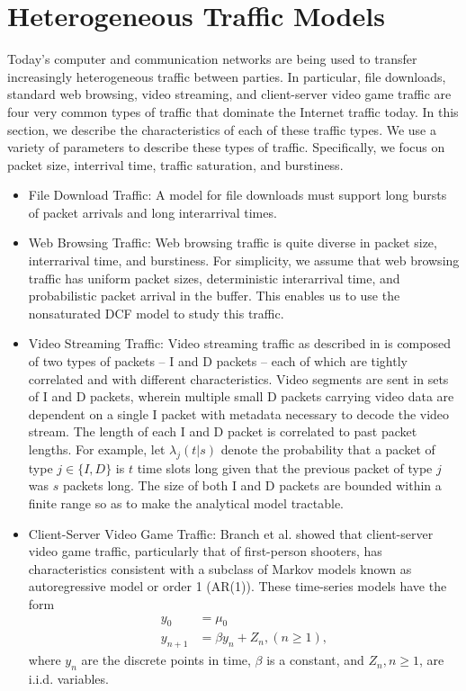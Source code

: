 \documentclass[conference]{IEEEtran}
\begin{document}

\section{Heterogeneous Traffic Models}
Today's computer and communication networks are being used to transfer increasingly heterogeneous traffic between parties. In particular, file downloads, standard web browsing, video streaming, and client-server video game traffic are four very common types of traffic that dominate the Internet traffic today. In this section, we describe the characteristics of each of these traffic types. We use a variety of parameters to describe these types of traffic. Specifically, we focus on packet size, interrival time, traffic saturation, and burstiness. 

\begin{itemize}
	\item File Download Traffic: A model for file downloads must support long bursts of packet arrivals and long interarrival times. 

	\item Web Browsing Traffic: Web browsing traffic is quite diverse in packet size, interrarival time, and burstiness. For simplicity, we assume that web browsing traffic has uniform packet sizes, deterministic interarrival time, and probabilistic packet arrival in the buffer. This enables us to use the nonsaturated DCF model to study this traffic.

	\item Video Streaming Traffic: Video streaming traffic as described in \cite{badia2010markov} is composed of two types of packets -- I and D packets -- each of which are tightly correlated and with different characteristics. Video segments are sent in sets of I and D packets, wherein multiple small D packets carrying video data are dependent on a single I packet with metadata necessary to decode the video stream. The length of each I and D packet is correlated to past packet lengths. For example, let $\lambda_j(t|s)$ denote the probability that a packet of type $j \in \{I ,D \}$ is $t$ time slots long given that the previous packet of type $j$ was $s$ packets long. The size of both I and D packets are bounded within a finite range so as to make the analytical model tractable. 

	\item Client-Server Video Game Traffic: Branch et al. \cite{branch2008markov} showed that client-server video game traffic, particularly that of first-person shooters, has characteristics consistent with a subclass of Markov models known as autoregressive model or order 1 (AR(1)). These time-series models have the form
	\begin{align*}
	y_0 & = \mu_0 \\
	y_{n+1} & = \beta y_n + Z_n, (n \geq 1),
	\end{align*}
	where $y_n$ are the discrete points in time, $\beta$ is a constant, and $Z_n, n \geq 1$, are i.i.d. variables. 
\end{itemize}
\end{document}

